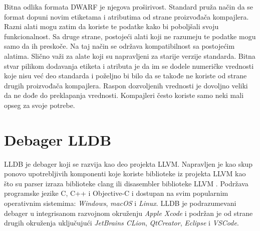 \documentclass[12pt,oneside]{memoir}
\begin{document}
Bitna odlika formata DWARF je njegova proširivost.
Standard pruža način da se format dopuni novim etiketama i atributima od strane proizvođača kompajlera.
Razni alati mogu zatim da koriste te podatke kako bi poboljšali svoju funkcionalnost.
Sa druge strane, postojeći alati koji ne razumeju te podatke mogu samo da ih preskoče.
Na taj način se održava kompatibilnost sa postojećim alatima.
Slično važi za alate koji su napravljeni za starije verzije standarda.
Bitna stvar pilikom dodavanja etiketa i atributa je da im se dodele numeričke vrednosti koje nisu već deo standarda i poželjno bi bilo da se takođe ne koriste od strane drugih proizvođača kompajlera.
Raspon dozvoljenih vrednosti je dovoljno veliki da ne dođe do preklapanja vrednosti.
Kompajleri često koriste samo neki mali opseg za svoje potrebe.

\section{Debager LLDB}
\label{sec:lldb}



LLDB je debager koji se razvija kao deo projekta LLVM.
Napravljen je kao skup ponovo upotrebljivih komponenti koje koriste biblioteke iz projekta LLVM kao što su parser izraza biblioteke clang ili disasembler biblioteke LLVM \cite{lldb}.
Podržava programske jezike C, C++ i Objective-C i dostupan na svim popularnim operativnim sistemima: \textit{Windows}, \textit{macOS} i \textit{Linux}.
LLDB je podrazumevani debager u integrisanom razvojnom okruženju \textit{Apple Xcode} i podržan je od strane drugih okruženja uključujući \textit{JetBrains CLion}, \textit{QtCreator}, \textit{Eclipse} i \textit{VSCode}.
\end{document}
